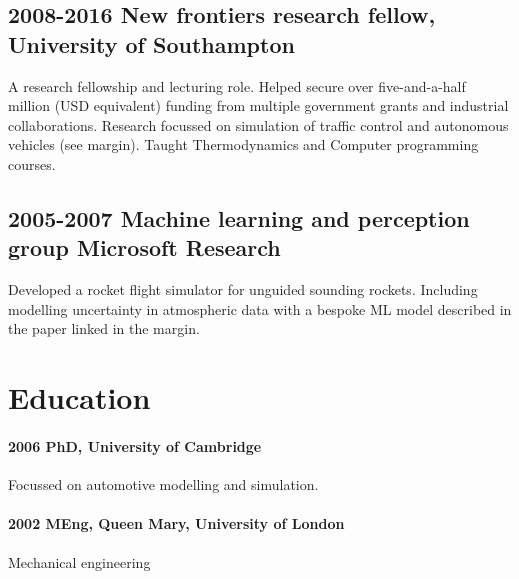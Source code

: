 \subsection{2008-2016 New frontiers research fellow, University of Southampton}

\marginnote{\href{}{}}
\marginnote{\href{}{}}
\marginnote{\href{}{}}
A research fellowship and lecturing role. Helped secure over five-and-a-half million (USD equivalent) funding from multiple government grants and industrial collaborations. Research focussed on simulation of traffic control and autonomous vehicles (see margin). Taught Thermodynamics and Computer programming courses.

\subsection{2005-2007 Machine learning and perception group Microsoft Research}
Developed a rocket flight simulator for unguided sounding rockets. Including modelling uncertainty in atmospheric data with a bespoke ML model described in the paper linked in the margin.

\section{Education}
\paragraph{2006 PhD, University of Cambridge}
Focussed on automotive modelling and simulation.
\paragraph{2002 MEng, Queen Mary, University of London}
Mechanical engineering
